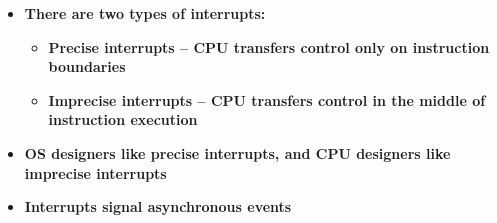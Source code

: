 \documentclass[12pt]{article}
\begin{document}
\begin{itemize}
	\item {\fontsize{16pt}{19.2pt}\selectfont \textbf{There are two types of interrupts: }\par}\par

\begin{itemize}
	\item {\fontsize{16pt}{19.2pt}\selectfont \textbf{Precise interrupts – CPU transfers control only on instruction boundaries}\par}\par

	\item {\fontsize{16pt}{19.2pt}\selectfont \textbf{Imprecise interrupts – CPU transfers control in the middle of instruction execution}\par}
\end{itemize}\par

	\item {\fontsize{16pt}{19.2pt}\selectfont \textbf{OS designers like precise interrupts, and CPU designers like imprecise interrupts}\par}\par

	\item {\fontsize{16pt}{19.2pt}\selectfont \textbf{Interrupts signal asynchronous events}\par}
\end{itemize}\par
\end{document}
